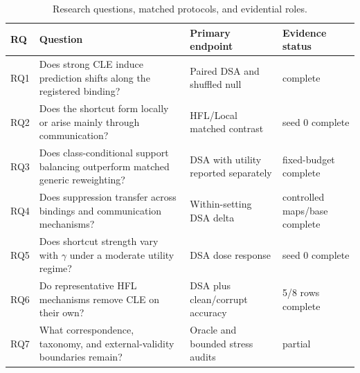 \begin{table}[t]
\centering
\small
\caption{Research questions, matched protocols, and evidential roles.}
\label{tab:research-questions}
\begin{tabularx}{\textwidth}{lXll}
\toprule
RQ & Question & Primary endpoint & Evidence status \\
\midrule
RQ1 & Does strong CLE induce prediction shifts along the registered binding? & Paired DSA and shuffled null & complete \\
RQ2 & Does the shortcut form locally or arise mainly through communication? & HFL/Local matched contrast & seed 0 complete \\
RQ3 & Does class-conditional support balancing outperform matched generic reweighting? & DSA with utility reported separately & fixed-budget complete \\
RQ4 & Does suppression transfer across bindings and communication mechanisms? & Within-setting DSA delta & controlled maps/base complete \\
RQ5 & Does shortcut strength vary with \(\gamma\) under a moderate utility regime? & DSA dose response & seed 0 complete \\
RQ6 & Do representative HFL mechanisms remove CLE on their own? & DSA plus clean/corrupt accuracy & 5/8 rows complete \\
RQ7 & What correspondence, taxonomy, and external-validity boundaries remain? & Oracle and bounded stress audits & partial \\
\bottomrule
\end{tabularx}
\end{table}
